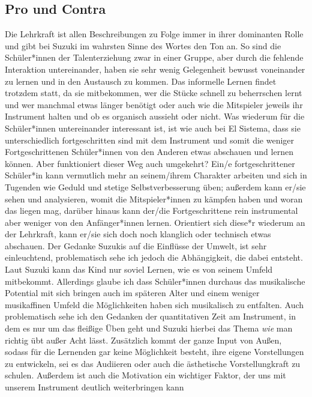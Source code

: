 \subsection{Pro und Contra}

Die Lehrkraft ist allen Beschreibungen zu Folge immer in ihrer dominanten Rolle
und gibt bei Suzuki im wahrsten Sinne des Wortes den Ton an. So sind die
Schüler*innen der Talenterziehung zwar in einer Gruppe, aber durch die fehlende
Interaktion untereinander, haben sie sehr wenig Gelegenheit bewusst voneinander
zu lernen und in den Austausch zu kommen. Das informelle Lernen findet
trotzdem statt, da sie mitbekommen, wer die Stücke schnell zu beherrschen lernt
und wer manchmal etwas länger benötigt oder auch wie die Mitspieler jeweils ihr
Instrument halten und ob es organisch aussieht oder nicht. Was wiederum für die
Schüler*innen untereinander interessant ist, ist wie auch bei El Sistema, dass
sie unterschiedlich fortgeschritten sind mit dem Instrument und somit die
weniger Fortgeschrittenen Schüler*innen von den Anderen etwas abschauen und
lernen können. Aber funktioniert dieser Weg auch umgekehrt? Ein/e
fortgeschrittener Schüler*in kann vermutlich mehr an seinem/ihrem Charakter
arbeiten und sich in Tugenden wie Geduld und stetige Selbstverbesserung üben;
außerdem kann er/sie sehen und analysieren, womit die Mitspieler*innen zu
kämpfen haben und woran das liegen mag, darüber hinaus kann der/die
Fortgeschrittene rein instrumental aber weniger von den Anfänger*innen lernen.
Orientiert sich diese*r wiederum an der Lehrkraft, kann er/sie sich doch noch
klanglich oder technisch etwas abschauen. Der Gedanke Suzukis auf die Einflüsse
der Umwelt, ist sehr einleuchtend, problematisch sehe ich jedoch die
Abhängigkeit, die dabei entsteht. Laut Suzuki kann das Kind nur soviel Lernen,
wie es von seinem Umfeld mitbekommt. Allerdings glaube ich dass Schüler*innen
durchaus das musikalische Potential mit sich bringen auch im späteren Alter und
einem weniger musikaffinen Umfeld die Möglichkeiten haben sich musikalisch zu
entfalten. Auch problematisch sehe ich den Gedanken der quantitativen Zeit am
Instrument, in dem es nur um das fleißige Üben geht und Suzuki hierbei das Thema
\emph{wie} man richtig übt außer Acht lässt. Zusätzlich kommt der ganze Input
von Außen, sodass für die Lernenden gar keine Möglichkeit besteht, ihre eigene
Vorstellungen zu entwickeln, sei es das Audiieren oder auch die
ästhetische Vorstellungkraft zu schulen. Außerdem ist auch die Motivation
ein wichtiger Faktor, der uns mit unserem Instrument deutlich weiterbringen kann
